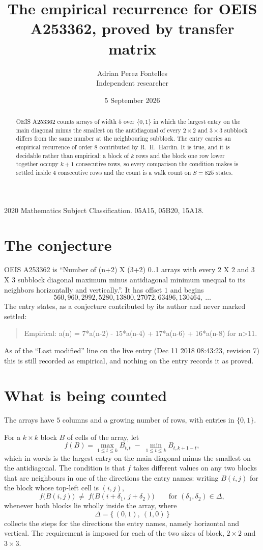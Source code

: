 \documentclass[11pt,a4paper]{article}
\title{The empirical recurrence for OEIS A253362, proved by transfer matrix}
\author{Adrian Perez Fontelles\\ \small Independent researcher}
\date{5 September 2026}
\theoremstyle{plain}
\theoremstyle{definition}
\begin{document}
\maketitle

\begin{abstract}
OEIS A253362 counts arrays of width $5$ over $\{0,1\}$ in which the largest entry on the main diagonal minus the smallest on the antidiagonal of every $2\times2$ and $3\times3$ subblock differs from the same number at the neighbouring subblock. The entry carries an
empirical recurrence of order $8$ contributed by R.~H.~Hardin. It is true, and it is
decidable rather than empirical: a block of $k$ rows and the block one row lower together
occupy $k+1$ consecutive rows, so every comparison the condition makes is settled inside
$4$ consecutive rows and the count is a walk count on $S=825$ states.
\end{abstract}

\noindent\small 2020 Mathematics Subject Classification. 05A15, 05B20, 15A18.\normalsize

\section{The conjecture}

OEIS A253362 is ``Number of (n+2) X (3+2) 0..1 arrays with every 2 X 2 and 3 X 3 subblock diagonal maximum minus antidiagonal minimum unequal to its neighbors horizontally and vertically.''. It has offset $1$ and begins
\[
560, 960, 2992, 5280, 13800, 27072, 63496, 130464,\ \dots
\]
The entry states, as a conjecture contributed by its author and never marked settled:
\begin{quote}
Empirical: a(n) = 7*a(n-2) - 15*a(n-4) + 17*a(n-6) + 16*a(n-8) for n>11.
\end{quote}
As of the ``Last modified'' line on the live entry (Dec 11 2018 08:43:23, revision 7) this is still
recorded as empirical, and nothing on the entry records it as proved.

\section{What is being counted}

The arrays have $5$ columns and a growing number of rows, with entries in $\{0,1\}$.

For a $k\times k$ block $B$ of cells of the array, let
\[
f(B)=\max_{1\le t\le k}B_{t,t}\;-\;\min_{1\le t\le k}B_{t,k+1-t} ,
\]
which in words is the largest entry on the main diagonal minus the smallest on the antidiagonal. The condition is that $f$ takes different values on any two blocks that
are neighbours in one of the directions the entry names: writing $B(i,j)$ for the block whose
top-left cell is $(i,j)$,
\[
f\bigl(B(i,j)\bigr)\;\neq\;f\bigl(B(i+\delta_1,\,j+\delta_2)\bigr)
\qquad\text{for }(\delta_1,\delta_2)\in\Delta,
\]
whenever both blocks lie wholly inside the array, where
\[
\Delta=\{\,(0,1),\ (1,0)\,\}
\]
collects the steps for the directions the entry names, namely horizontal and vertical. The
requirement is imposed for each of the two sizes of block, $2\times2$ and $3\times3$.
\end{document}
